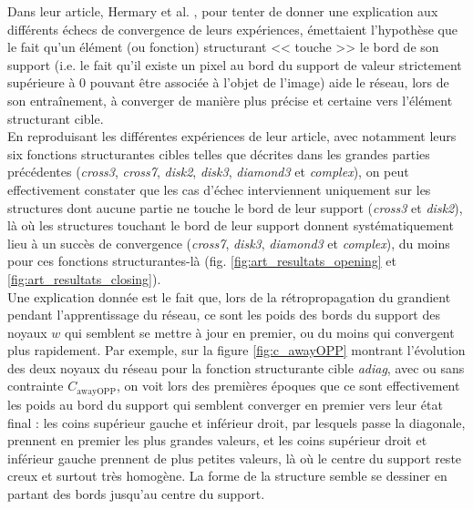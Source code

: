 Dans leur article, Hermary et al. \cite{Hermary_2022}, pour tenter de donner une explication aux différents échecs de convergence de leurs expériences, émettaient l'hypothèse que le fait qu'un élément (ou fonction) structurant << touche >> le bord de son support (i.e. le fait qu'il existe un pixel au bord du support de valeur strictement supérieure à 0 pouvant être associée à l'objet de l'image) aide le réseau, lors de son entraînement, à converger de manière plus précise et certaine vers l'élément structurant cible. \\

\vspace{-1.6mm}
\noindent En reproduisant les différentes expériences de leur article, avec notamment leurs six fonctions structurantes cibles telles que décrites dans les grandes parties précédentes (\textit{cross3}, \textit{cross7}, \textit{disk2}, \textit{disk3}, \textit{diamond3} et \textit{complex}), on peut effectivement constater que les cas d'échec interviennent uniquement sur les structures dont aucune partie ne touche le bord de leur support (\textit{cross3} et \textit{disk2}), là où les structures touchant le bord de leur support donnent systématiquement lieu à un succès de convergence (\textit{cross7}, \textit{disk3}, \textit{diamond3} et \textit{complex}), du moins pour ces fonctions structurantes-là (fig. \ref{fig:art_resultats_opening} et \ref{fig:art_resultats_closing}). \\

\vspace{-1.6mm}
\noindent Une explication donnée est le fait que, lors de la rétropropagation du grandient pendant l'apprentissage du réseau, ce sont les poids des bords du support des noyaux $w$ qui semblent se mettre à jour en premier, ou du moins qui convergent plus rapidement. Par exemple, sur la figure \ref{fig:c_awayOPP} montrant l'évolution des deux noyaux du réseau pour la fonction structurante cible \textit{adiag}, avec ou sans contrainte $C_\text{awayOPP}$, on voit lors des premières époques que ce sont effectivement les poids au bord du support qui semblent converger en premier vers leur état final : les coins supérieur gauche et inférieur droit, par lesquels passe la diagonale, prennent en premier les plus grandes valeurs, et les coins supérieur droit et inférieur gauche prennent de plus petites valeurs, là où le centre du support reste creux et surtout très homogène. La forme de la structure semble se dessiner en partant des bords jusqu'au centre du support. \\

